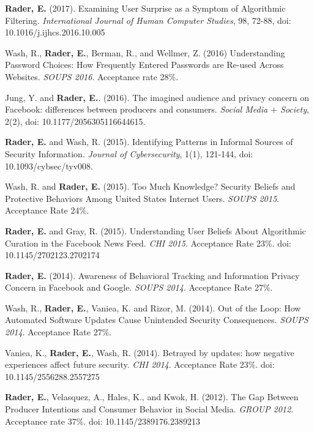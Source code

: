 \documentclass[9pt]{extarticle}
\makeatletter
\renewcommand{\section}{%
  \@startsection{section}{1}{0em}{\baselineskip}{3pt}{\large\bfseries\textsc}}
\makeatother
\begin{document}
\section{Peer-Reviewed Publications}

\textbf{Rader, E.} (2017). Examining User Surprise as a Symptom of Algorithmic Filtering. \emph{International Journal of Human Computer Studies}, 98, 72-88, doi: 10.1016/j.ijhcs.2016.10.005

Wash, R., \textbf{Rader, E.}, Berman, R., and Wellmer, Z. (2016) Understanding Password Choices: How Frequently Entered Passwords are Re-used Across Websites. \emph{SOUPS 2016}. Acceptance rate 28\%.

Jung, Y. and \textbf{Rader, E.}. (2016). The imagined audience and privacy concern on Facebook: differences between producers and consumers. \emph{Social Media $+$ Society}, 2(2), doi: 10.1177/2056305116644615.

\textbf{Rader, E.} and Wash, R. (2015). Identifying Patterns in Informal Sources of Security Information. \emph{Journal of Cybersecurity}, 1(1), 121-144, doi: 10.1093/cybsec/tyv008.

Wash, R. and \textbf{Rader, E.} (2015). Too Much Knowledge? Security Beliefs and Protective Behaviors Among United States Internet Users. \emph{SOUPS 2015}. Acceptance Rate 24\%.

\textbf{Rader, E.} and Gray, R. (2015). Understanding User Beliefs About Algorithmic Curation in the Facebook News Feed. \emph{CHI 2015}. Acceptance Rate 23\%. doi: 10.1145/2702123.2702174

\textbf{Rader, E.} (2014). Awareness of Behavioral Tracking and Information Privacy Concern in Facebook and Google. \emph{SOUPS 2014}. Acceptance Rate 27\%.

Wash, R., \textbf{Rader, E.}, Vaniea, K. and Rizor, M. (2014). Out of the Loop: How Automated Software Updates Cause Unintended Security Consequences. \emph{SOUPS 2014}. Acceptance Rate 27\%.

Vaniea, K., \textbf{Rader, E.}, Wash, R. (2014). Betrayed by updates: how negative experiences affect future security. \emph{CHI 2014}. Acceptance Rate 23\%. doi: 10.1145/2556288.2557275

\textbf{Rader, E.}, Velasquez, A., Hales, K., and Kwok, H. (2012). The Gap Between Producer Intentions and Consumer Behavior in Social Media. \emph{GROUP 2012}. Acceptance rate 37\%. doi: 10.1145/2389176.2389213
\end{document}
